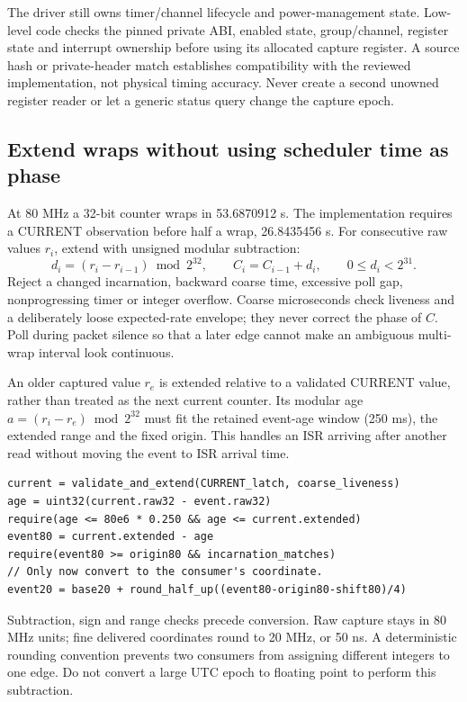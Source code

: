 \documentclass[10pt,letterpaper]{article}
\begin{document}
The driver still owns timer/channel lifecycle and power-management state. Low-level code checks the pinned private ABI, enabled state, group/channel, register state and interrupt ownership before using its allocated capture register. A source hash or private-header match establishes compatibility with the reviewed implementation, not physical timing accuracy. Never create a second unowned register reader or let a generic status query change the capture epoch.

\subsection{Extend wraps without using scheduler time as phase}
At 80 MHz a 32-bit counter wraps in 53.6870912 s. The implementation requires a CURRENT observation before half a wrap, 26.8435456 s. For consecutive raw values $r_i$, extend with unsigned modular subtraction:
\[
 d_i=(r_i-r_{i-1})\bmod 2^{32},\qquad C_i=C_{i-1}+d_i,
 \qquad 0\le d_i<2^{31}.
\]
Reject a changed incarnation, backward coarse time, excessive poll gap, nonprogressing timer or integer overflow. Coarse microseconds check liveness and a deliberately loose expected-rate envelope; they never correct the phase of $C$. Poll during packet silence so that a later edge cannot make an ambiguous multi-wrap interval look continuous.

An older captured value $r_e$ is extended relative to a validated CURRENT value, rather than treated as the next current counter. Its modular age $a=(r_i-r_e)\bmod2^{32}$ must fit the retained event-age window (250 ms), the extended range and the fixed origin. This handles an ISR arriving after another read without moving the event to ISR arrival time.

\begin{lstlisting}
current = validate_and_extend(CURRENT_latch, coarse_liveness)
age = uint32(current.raw32 - event.raw32)
require(age <= 80e6 * 0.250 && age <= current.extended)
event80 = current.extended - age
require(event80 >= origin80 && incarnation_matches)
// Only now convert to the consumer's coordinate.
event20 = base20 + round_half_up((event80-origin80-shift80)/4)
\end{lstlisting}

Subtraction, sign and range checks precede conversion. Raw capture stays in 80 MHz units; fine delivered coordinates round to 20 MHz, or 50 ns. A deterministic rounding convention prevents two consumers from assigning different integers to one edge. Do not convert a large UTC epoch to floating point to perform this subtraction.
\end{document}
